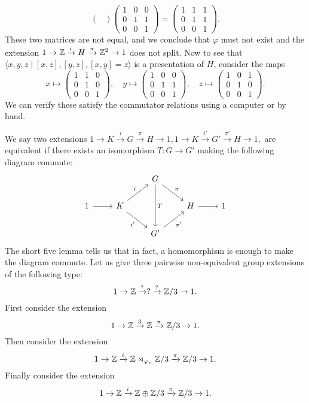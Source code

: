 \begin{ex}
\[\begin{pmatrix}
    \end{pmatrix}
    \begin{pmatrix}
        1 & 0 & 0 \\ 0 & 1 & 1 \\ 0 & 0 & 1
    \end{pmatrix}=
    \begin{pmatrix}
        1 & 1 & 1 \\ 0 & 1 & 1 \\ 0 & 0 & 1 
    \end{pmatrix}.
    \] These two matrices are not equal, and we conclude that $\varphi $ must not exist and the extension $1 \to  \mathbb{Z} \xrightarrow iH \xrightarrow{\pi} \mathbb{Z}^2 \to 1$ does not split.
    Now to see that $\langle x,y,z \mid [x,z],[y,z],[x,y]=z \rangle $ is a presentation of $H$, consider the maps \[
    x \mapsto 
    \begin{pmatrix}
        1 & 1 & 0 \\ 0 & 1 & 0 \\ 0 & 0 & 1 
    \end{pmatrix},\quad
    y \mapsto 
    \begin{pmatrix}
        1 & 0 & 0 \\ 0 & 1 & 1 \\ 0 & 0 & 1 
    \end{pmatrix},\quad
    z \mapsto 
    \begin{pmatrix}
        1 & 0 & 1 \\ 0 & 1 & 0 \\ 0 & 0 & 1 
    \end{pmatrix}.
    \] We can verify these satisfy the commutator relations using a computer or by hand.
\end{ex}
\begin{ex}
    We say two extensions $1 \to K \xrightarrow iG \xrightarrow{\pi} H \to 1,1 \to K \xrightarrow{i'} G' \xrightarrow{\pi'} H \to 1,$ are equivalent if there exists an isomorphism $T \colon G \to G'$ making the following diagram commute:
\[
\begin{tikzcd}
            &                                     & G \arrow[rd, "\pi"] \arrow[dd, "T"] &             &   \\
1 \arrow[r] & K \arrow[ru, "i"] \arrow[rd, "i'"'] &                                     & H \arrow[r] & 1 \\
            &                                     & G' \arrow[ru, "\pi'"']              &             &  
\end{tikzcd}
\] 
    The short five lemma tells us that in fact, a homomorphism is enough to make the diagram commute. Let us give three pairwise non-equivalent group extensions of the following type: \[
    1 \to  \mathbb{Z} \xrightarrow?  ? \xrightarrow? \mathbb{Z}/3 \to 1.
\] First consider the extension \[
1 \to  \mathbb{Z} \xrightarrow 3 \mathbb{Z} \xrightarrow{\pi} \mathbb{Z} /3 \to 1.
\] Then consider the extension \[
1 \to \mathbb{Z} \xrightarrow i \mathbb{Z} \rtimes_{\varphi _n } \mathbb{Z} /3 \xrightarrow{\pi} \mathbb{Z} /3 \to 1.
\] Finally consider the extension \[
1 \to \mathbb{Z} \xrightarrow i \mathbb{Z} \oplus \mathbb{Z} /3 \xrightarrow{\pi} \mathbb{Z} /3 \to 1.
\] 
\end{ex}
